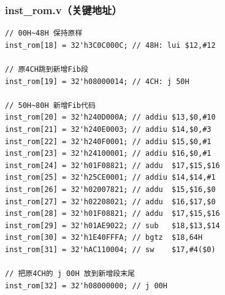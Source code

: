 ﻿\documentclass{article}
\begin{document}
\subsubsection{inst\_rom.v（关键地址）}
\begin{verbatim}
// 00H~48H 保持原样
inst_rom[18] = 32'h3C0C000C; // 48H: lui $12,#12

// 原4CH跳到新增Fib段
inst_rom[19] = 32'h08000014; // 4CH: j 50H

// 50H~80H 新增Fib代码
inst_rom[20] = 32'h240D000A; // addiu $13,$0,#10
inst_rom[21] = 32'h240E0003; // addiu $14,$0,#3
inst_rom[22] = 32'h240F0001; // addiu $15,$0,#1
inst_rom[23] = 32'h24100001; // addiu $16,$0,#1
inst_rom[24] = 32'h01F08821; // addu  $17,$15,$16
inst_rom[25] = 32'h25CE0001; // addiu $14,$14,#1
inst_rom[26] = 32'h02007821; // addu  $15,$16,$0
inst_rom[27] = 32'h02208021; // addu  $16,$17,$0
inst_rom[28] = 32'h01F08821; // addu  $17,$15,$16
inst_rom[29] = 32'h01AE9022; // sub   $18,$13,$14
inst_rom[30] = 32'h1E40FFFA; // bgtz  $18,64H
inst_rom[31] = 32'hAC110004; // sw    $17,#4($0)

// 把原4CH的 j 00H 放到新增段末尾
inst_rom[32] = 32'h08000000; // j 00H
\end{verbatim}
\end{document}
